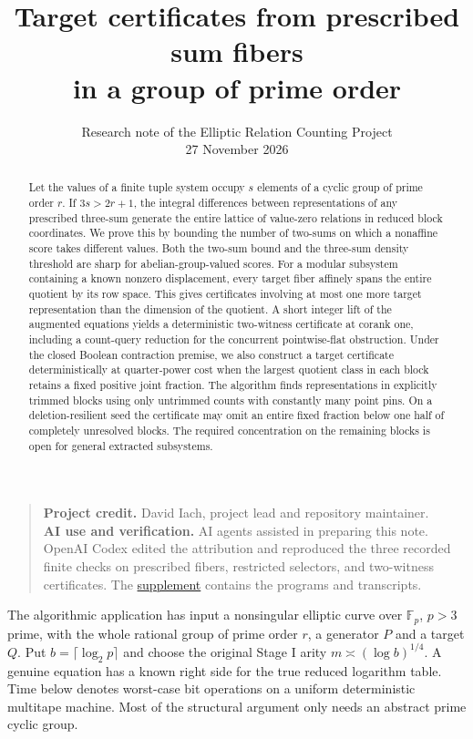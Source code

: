 \documentclass[11pt]{article}
\title{Target certificates from prescribed sum fibers\\in a group of prime order}
\author{}
\date{\normalsize Research note of the Elliptic Relation Counting Project\\27 November 2026}
\newcommand{\projectcredit}{David Iach, project lead and repository maintainer}
\newcommand{\F}{\mathbb F}
\begin{document}
\maketitle
\begin{abstract}
Let the values of a finite tuple system occupy $s$ elements of a cyclic group of prime order $r$. If $3s>2r+1$, the integral differences between representations of any prescribed three-sum generate the entire lattice of value-zero relations in reduced block coordinates. We prove this by bounding the number of two-sums on which a nonaffine score takes different values. Both the two-sum bound and the three-sum density threshold are sharp for abelian-group-valued scores. For a modular subsystem containing a known nonzero displacement, every target fiber affinely spans the entire quotient by its row space. This gives certificates involving at most one more target representation than the dimension of the quotient. A short integer lift of the augmented equations yields a deterministic two-witness certificate at corank one, including a count-query reduction for the concurrent pointwise-flat obstruction. Under the closed Boolean contraction premise, we also construct a target certificate deterministically at quarter-power cost when the largest quotient class in each block retains a fixed positive joint fraction. The algorithm finds representations in explicitly trimmed blocks using only untrimmed counts with constantly many point pins. On a deletion-resilient seed the certificate may omit an entire fixed fraction below one half of completely unresolved blocks. The required concentration on the remaining blocks is open for general extracted subsystems.
\end{abstract}

\begin{quote}\small
\textbf{Project credit.} \projectcredit.\\
\textbf{AI use and verification.} AI agents assisted in preparing this note. OpenAI Codex edited the attribution and reproduced the three recorded finite checks on prescribed fibers, restricted selectors, and two-witness certificates. The \href{https://github.com/davidiach/elliptic-relation-counting/tree/e833763d99b9e17e3c3544e0e01ad409bc111ed6/research/prescribed_fiber_rigidity}{supplement} contains the programs and transcripts.
\end{quote}

The algorithmic application has input a nonsingular elliptic curve over $\F_p$, $p>3$ prime, with the whole rational group of prime order $r$, a generator $P$ and a target $Q$. Put $b=\lceil\log_2 p\rceil$ and choose the original Stage I arity $m\asymp(\log b)^{1/4}$. A genuine equation has a known right side for the true reduced logarithm table. Time below denotes worst-case bit operations on a uniform deterministic multitape machine. Most of the structural argument only needs an abstract prime cyclic group.
\end{document}
